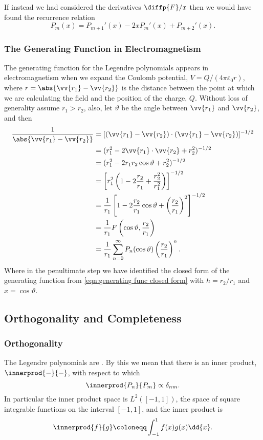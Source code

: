 \documentclass[fleqn]{NotesClass}
\begin{document}
    If instead we had considered the derivatives \(\diffp{F}/{x}\) then we would have found the recurrence relation
    \begin{equation}\label{eqn:legendre recursion formula}
        P_m(x) = P_{m+1}'(x) - 2xP_m'(x) + P_{m+2}'(x).
    \end{equation}

    \subsubsection{The Generating Function in Electromagnetism}
    The generating function for the Legendre polynomials appears in electromagnetism when we expand the Coulomb potential, \(V = Q/(4\pi\varepsilon_0r)\), where \(r = \abs{\vv{r_1} - \vv{r_2}}\) is the distance between the point at which we are calculating the field and the position of the charge, \(Q\).
    Without loss of generality assume \(r_1 > r_2\), also, let \(\vartheta\) be the angle between \(\vv{r_1}\) and \(\vv{r_2}\), and then
    \begin{align}
        \frac{1}{\abs{\vv{r_1} - \vv{r_2}}} &= [(\vv{r_1} - \vv{r_2}) \cdot (\vv{r_1} - \vv{r_2})]^{-1/2}\\
        &= (r_1^2 - 2\vv{r_1} \cdot \vv{r_2} + r_2^2)^{-1/2}\\
        &= (r_1^2 - 2r_1r_2\cos\vartheta + r_2^2)^{-1/2}\\
        &= \left[ r_1^2 \left( 1 - 2\frac{r_2}{r_1} + \frac{r_2^2}{r_1^2} \right) \right]^{-1/2}\\
        &= \frac{1}{r_1} \left[ 1 - 2\frac{r_2}{r_1}\cos\vartheta + \left( \frac{r_2}{r_1} \right)^2 \right]^{-1/2}\\
        &= \frac{1}{r_1} F\left( \cos\vartheta, \frac{r_2}{r_1} \right)\\
        &= \frac{1}{r_1} \sum_{n=0}^{\infty} P_n(\cos\vartheta) \left( \frac{r_2}{r_1} \right)^{n}.
    \end{align}
    Where in the penultimate step we have identified the closed form of the generating function from \cref{eqn:generating func closed form} with \(h = r_2/r_1\) and \(x = \cos\vartheta\).
    
    \subsection{Orthogonality and Completeness}
    \subsubsection{Orthogonality}
    The Legendre polynomials are .
    By this we mean that there is an inner product, \(\innerprod{-}{-}\), with respect to which
    \begin{equation}
        \innerprod{P_n}{P_m} \propto \delta_{nm}.
    \end{equation}
    In particular the inner product space is \(L^2([-1, 1])\), the space of square integrable functions on the interval \([-1, 1]\), and the inner product is
    \begin{equation}
        \innerprod{f}{g} \coloneqq \int_{-1}^{1} f(x)g(x) \dd{x}.
    \end{equation}
    
\end{document}
